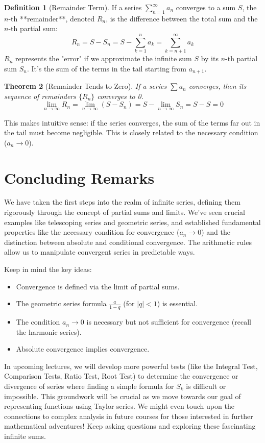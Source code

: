 \documentclass[11pt]{article}
\newtheorem{theorem}{Theorem}[section]
\theoremstyle{definition}
\newtheorem{definition}[theorem]{Definition}
\theoremstyle{remark}
\begin{document}
\begin{definition}[Remainder Term]
If a series $\sum_{n=1}^{\infty} a_n$ converges to a sum $S$, the $n$-th **remainder**, denoted $R_n$, is the difference between the total sum and the $n$-th partial sum:
\[ R_n = S - S_n = S - \sum_{k=1}^{n} a_k = \sum_{k=n+1}^{\infty} a_k \]
$R_n$ represents the "error" if we approximate the infinite sum $S$ by its $n$-th partial sum $S_n$. It's the sum of the terms in the tail starting from $a_{n+1}$.
\end{definition}

\begin{theorem}[Remainder Tends to Zero]
If a series $\sum a_n$ converges, then its sequence of remainders $\{R_n\}$ converges to 0.
\[ \lim_{n \to \infty} R_n = \lim_{n \to \infty} \left( S - S_n \right) = S - \lim_{n \to \infty} S_n = S - S = 0 \]
\end{theorem}

This makes intuitive sense: if the series converges, the sum of the terms far out in the tail must become negligible. This is closely related to the necessary condition ($a_n \to 0$).

\section{Concluding Remarks}

We have taken the first steps into the realm of infinite series, defining them rigorously through the concept of partial sums and limits. We've seen crucial examples like telescoping series and geometric series, and established fundamental properties like the necessary condition for convergence ($a_n \to 0$) and the distinction between absolute and conditional convergence. The arithmetic rules allow us to manipulate convergent series in predictable ways.

Keep in mind the key ideas:
\begin{itemize}
    \item Convergence is defined via the limit of partial sums.
    \item The geometric series formula $\frac{a}{1-q}$ (for $|q|<1$) is essential.
    \item The condition $a_n \to 0$ is necessary but not sufficient for convergence (recall the harmonic series).
    \item Absolute convergence implies convergence.
\end{itemize}

In upcoming lectures, we will develop more powerful tests (like the Integral Test, Comparison Tests, Ratio Test, Root Test) to determine the convergence or divergence of series where finding a simple formula for $S_k$ is difficult or impossible. This groundwork will be crucial as we move towards our goal of representing functions using Taylor series. We might even touch upon the connections to complex analysis in future courses for those interested in further mathematical adventures! Keep asking questions and exploring these fascinating infinite sums.
\end{document}
